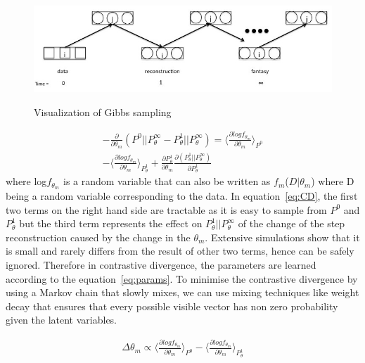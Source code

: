 \documentclass[runningheads,a4paper]{llncs}
\begin{document}
 \begin{figure}[t]
\centering
\includegraphics[width=12cm,height=4cm]{gibbs.jpg}
\caption{Visualization of Gibbs sampling}
\label{fig:gibbs}
\end{figure}

\begin{eqnarray}
- \frac {\partial} {\partial\theta_{m}} (P^0 || P^\infty_\theta - P^1_\theta || P^\infty_\theta) = \langle \frac {\partial log f_{\theta_{m}}}{\partial \theta_m} \rangle_{P^0} \\
- \langle \frac {\partial log f_{\theta_{m}}}{\partial \theta_m} \rangle_{P^1_\theta} + \nonumber \frac{\partial{P^1_\theta}}{\partial\theta_m} \frac{\partial(P^1_\theta || P^\infty_\theta)}{\partial{P^1_\theta}}
 \label{eq:CD}
\end{eqnarray}
where log$f_{\theta_{m}}$ is a random variable that can also be written as $f_m$($D|\theta_m$) where D being a random variable corresponding to the data.
In equation~\ref{eq:CD}, the first two terms on the right hand side are tractable as it is easy to sample from $P^0$ and $P^1_\theta$ but the third term represents the effect on $P^1_\theta || P^\infty_\theta$ of the change of the step reconstruction caused by the change in the $\theta_m$. Extensive simulations show that it is small and rarely differs from the result of other two terms, hence can be safely ignored. Therefore in contrastive divergence, the parameters are learned according to the equation~\ref{eq:params}. To minimise the contrastive divergence by using a Markov chain that slowly mixes, we can use mixing techniques like weight decay that ensures that every possible visible vector has non zero probability given the latent variables.

\begin{eqnarray}
\Delta\theta_m \propto \langle \frac {\partial log f_{\theta_{m}}}{\partial \theta_m}\rangle_{P^0} - \langle \frac {\partial log f_{\theta_{m}}}{\partial \theta_m} \rangle_{P^1_\theta} \label{eq:params}
\end{eqnarray}
\end{document}
